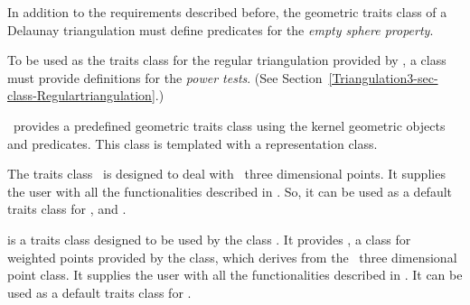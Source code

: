 In addition to the requirements described before, the geometric traits
class of a Delaunay triangulation must define predicates for the
\textit{empty sphere property}.

To be used as the traits class for the regular triangulation provided
by \cgal, a class must provide definitions for the \textit{power tests}.
(See Section~\ref{Triangulation3-sec-class-Regulartriangulation}.)
	
\cgal\ provides a predefined geometric traits class 
 using the kernel
geometric objects and predicates.
This class is templated with a representation class.

The traits class \ccClassTemplateName\ is designed to deal with \cgal\ three
dimensional points. It supplies the user with all
the functionalities described in
.
So, it can be used as a default traits
class for ,
 and
.

 is a traits class 
 designed to be used by the class
. It provides
, a class for weighted points
provided by the class, which derives from the \cgal\ three dimensional
point class. It supplies
the user with all the functionalities 
described in .
 It can be used as a default traits
class for .






